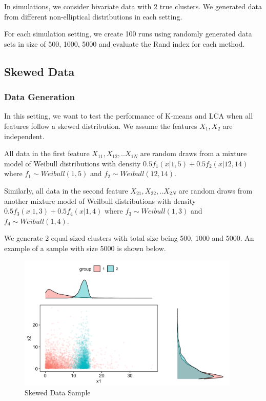 \documentclass[
]{article}
\begin{document}
In simulations, we consider bivariate data with 2 true clusters. We
generated data from different non-elliptical distributions in each
setting.

For each simulation setting, we create 100 runs using randomly generated
data sets in size of 500, 1000, 5000 and evaluate the Rand index for
each method.

\hypertarget{skewed-data}{%
\subsection{Skewed Data}\label{skewed-data}}

\hypertarget{data-generation}{%
\subsubsection{Data Generation}\label{data-generation}}

In this setting, we want to test the performance of K-means and LCA when
all features follow a skewed distribution. We assume the features
\(X_1, X_2\) are independent.

All data in the first feature \(X_{11}, X_{12},..X_{1N}\) are random
draws from a mixture model of Weibull distributions with density
\(0.5f_1(x|1,5) + 0.5f_2(x|12,14)\) where \(f_1 \sim Weibull(1,5)\) and
\(f_2 \sim Weibull (12,14)\).

Similarly, all data in the second feature \(X_{21}, X_{22},..X_{2N}\)
are random draws from another mixture model of Weilbull distributions
with density \(0.5f_3(x|1,3) + 0.5f_4(x|1,4)\) where
\(f_3 \sim Weibull(1,3)\) and \(f_4 \sim Weibull (1,4)\).

We generate 2 equal-sized clusters with total size being 500, 1000 and
5000. An example of a sample with size 5000 is shown below.

\begin{figure}
\centering
\includegraphics[width=4.16667in,height=\textheight]{report_image/skewed_sample.png}
\caption{Skewed Data Sample}
\end{figure}
\end{document}
